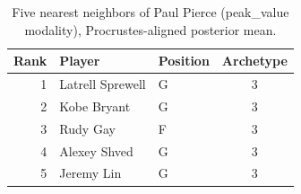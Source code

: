 \begin{table}[htbp]
  \centering\small
  \begin{tabular}{rllc}
    \toprule
    Rank & Player & Position & Archetype \\
    \midrule
    1 & Latrell Sprewell & G & 3 \\
    2 & Kobe Bryant & G & 3 \\
    3 & Rudy Gay & F & 3 \\
    4 & Alexey Shved & G & 3 \\
    5 & Jeremy Lin & G & 3 \\
    \bottomrule
  \end{tabular}
  \caption{Five nearest neighbors of Paul Pierce (peak_value modality), Procrustes-aligned posterior mean.}
  \label{tab:Paul_Pierce_neighbors_peak_value}
\end{table}

